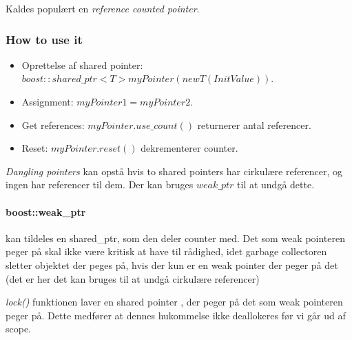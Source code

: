 Kaldes populært en \textit{reference counted pointer}.

\subsubsection{How to use it}
\begin{itemize}
	\item Oprettelse af shared pointer: $boost::shared\_ptr<T> myPointer(new T(InitValue))$.
	\item Assignment: $myPointer1 = myPointer2$.
	\item Get references: $myPointer.use\_count()$ returnerer antal referencer.
	\item Reset: $myPointer.reset()$ dekrementerer counter.
\end{itemize}

\textit{Dangling pointers} kan opstå hvis to shared pointers har cirkulære referencer, og ingen har referencer til dem. Der kan bruges $weak\_ptr$ til at undgå dette.

\paragraph{boost::weak\_ptr}
kan tildeles en shared\_ptr, som den deler counter med.
Det som weak pointeren peger på skal ikke være kritisk at have til rådighed, idet garbage collectoren sletter objektet der peges på, hvis der kun er en weak pointer der peger på det (det er her det kan bruges til at undgå cirkulære referencer)

\textit{lock()} funktionen laver en shared pointer , der peger på det som weak pointeren peger på. Dette medfører at dennes hukommelse ikke deallokeres før vi går ud af scope.